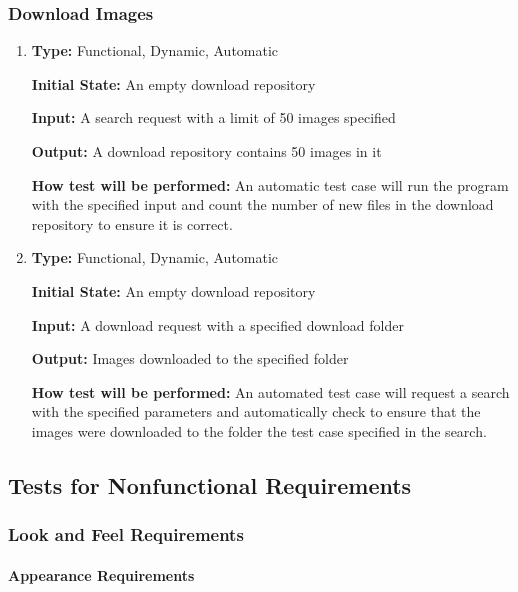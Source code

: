 \documentclass[12pt, titlepage]{article}
\begin{document}
\subsubsection{Download Images}

\begin{enumerate}[label=FR-DL\arabic*:, wide=0pt, leftmargin=*]

\item \phantom{empty}

\textbf{Type:} Functional, Dynamic, Automatic

\textbf{Initial State:} An empty download repository

\textbf{Input:} A search request with a limit of 50 images specified

\textbf{Output:} A download repository contains 50 images in it

\textbf{How test will be performed:} An automatic test case will run the program with the specified input and count the number of new files in the download repository to ensure it is correct.


\item \phantom{empty}

\textbf{Type:} Functional, Dynamic, Automatic
					
\textbf{Initial State:} An empty download repository
					
\textbf{Input:} A download request with a specified download folder
					
\textbf{Output:} Images downloaded to the specified folder
					
\textbf{How test will be performed:} An automated test case will request a search with the specified parameters and automatically check to ensure that the images were downloaded to the folder the test case specified in the search.

\end{enumerate}

\subsection{Tests for Nonfunctional Requirements}

\subsubsection{Look and Feel Requirements}
\label{LaFReqs}
		
\paragraph{Appearance Requirements}
\end{document}
